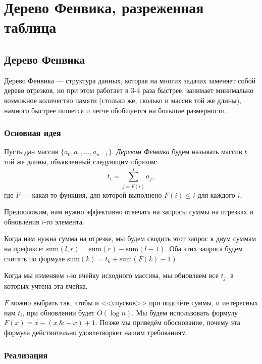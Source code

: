 \section{Дерево Фенвика, разреженная таблица}

\subsection{Дерево Фенвика}

Дерево Фенвика --- структура данных, которая на многих задачах заменяет собой дерево отрезков, но при этом работает в $3$-$4$ раза быстрее, занимает минимально возможное количество памяти (столько же, сколько и массив той же длины), намного быстрее пишется и легче обобщается на большие размерности.

\subsubsection{Основная идея}

\begin{definition}
    Пусть дан массив $\{a_0, a_1, \ldots, a_{n - 1}\}$. \textit{Деревом Фенвика} будем называть массив $t$ той же длины, объявленный следующим образом:
    \[
        t_i = \sum_{j = F(i)}^{i}a_j,
    \]
    где $F$ --- какая-то функция, для которой выполнено $F(i) \leqslant i$ для каждого $i$.
\end{definition}

Предположим, нам нужно эффективно отвечать на запросы суммы на отрезках и обновления $i$-го элемента.

Когда нам нужна сумма на отрезке, мы будем сводить этот запрос к двум суммам на префиксе: $\mathrm{sum}(l, r) = \mathrm{sum}(r) - \mathrm{sum}(l - 1)$. Оба этих запроса будем считать по формуле $\mathrm{sum}(k) = t_k + \mathrm{sum}(F(k) - 1)$.

Когда мы изменяем $i$-ю ячейку исходного массива, мы обновляем все $t_j$, в которых учтена эта ячейка.

$F$ можно выбрать так, чтобы и <<спусков>> при подсчёте суммы, и интересных нам $t_i$, при обновлении будет $O(\log n)$. Мы будем использовать формулу $F(x) = x - (x\:\&-x) + 1$. Позже мы приведём обоснование, почему эта формула действительно удовлетворяет нашим требованиям.

\subsubsection{Реализация}

